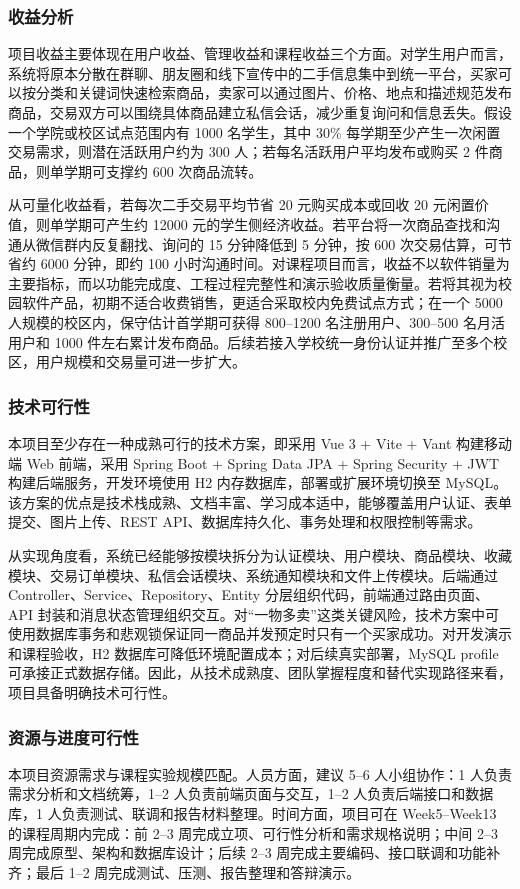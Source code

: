 ﻿\documentclass[UTF8,a4paper,12pt]{ctexart}
\begin{document}
\subsubsection{收益分析}
项目收益主要体现在用户收益、管理收益和课程收益三个方面。对学生用户而言，系统将原本分散在群聊、朋友圈和线下宣传中的二手信息集中到统一平台，买家可以按分类和关键词快速检索商品，卖家可以通过图片、价格、地点和描述规范发布商品，交易双方可以围绕具体商品建立私信会话，减少重复询问和信息丢失。假设一个学院或校区试点范围内有 1000 名学生，其中 30\% 每学期至少产生一次闲置交易需求，则潜在活跃用户约为 300 人；若每名活跃用户平均发布或购买 2 件商品，则单学期可支撑约 600 次商品流转。

从可量化收益看，若每次二手交易平均节省 20 元购买成本或回收 20 元闲置价值，则单学期可产生约 12000 元的学生侧经济收益。若平台将一次商品查找和沟通从微信群内反复翻找、询问的 15 分钟降低到 5 分钟，按 600 次交易估算，可节省约 6000 分钟，即约 100 小时沟通时间。对课程项目而言，收益不以软件销量为主要指标，而以功能完成度、工程过程完整性和演示验收质量衡量。若将其视为校园软件产品，初期不适合收费销售，更适合采取校内免费试点方式；在一个 5000 人规模的校区内，保守估计首学期可获得 800--1200 名注册用户、300--500 名月活用户和 1000 件左右累计发布商品。后续若接入学校统一身份认证并推广至多个校区，用户规模和交易量可进一步扩大。

\subsubsection{技术可行性}
本项目至少存在一种成熟可行的技术方案，即采用 Vue 3 + Vite + Vant 构建移动端 Web 前端，采用 Spring Boot + Spring Data JPA + Spring Security + JWT 构建后端服务，开发环境使用 H2 内存数据库，部署或扩展环境切换至 MySQL。该方案的优点是技术栈成熟、文档丰富、学习成本适中，能够覆盖用户认证、表单提交、图片上传、REST API、数据库持久化、事务处理和权限控制等需求。

从实现角度看，系统已经能够按模块拆分为认证模块、用户模块、商品模块、收藏模块、交易订单模块、私信会话模块、系统通知模块和文件上传模块。后端通过 Controller、Service、Repository、Entity 分层组织代码，前端通过路由页面、API 封装和消息状态管理组织交互。对“一物多卖”这类关键风险，技术方案中可使用数据库事务和悲观锁保证同一商品并发预定时只有一个买家成功。对开发演示和课程验收，H2 数据库可降低环境配置成本；对后续真实部署，MySQL profile 可承接正式数据存储。因此，从技术成熟度、团队掌握程度和替代实现路径来看，项目具备明确技术可行性。

\subsubsection{资源与进度可行性}
本项目资源需求与课程实验规模匹配。人员方面，建议 5--6 人小组协作：1 人负责需求分析和文档统筹，1--2 人负责前端页面与交互，1--2 人负责后端接口和数据库，1 人负责测试、联调和报告材料整理。时间方面，项目可在 Week5--Week13 的课程周期内完成：前 2--3 周完成立项、可行性分析和需求规格说明；中间 2--3 周完成原型、架构和数据库设计；后续 2--3 周完成主要编码、接口联调和功能补齐；最后 1--2 周完成测试、压测、报告整理和答辩演示。
\end{document}
